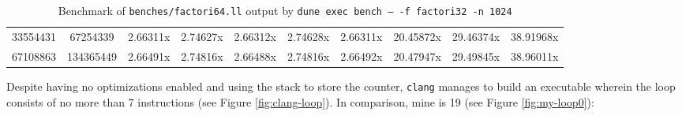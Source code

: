 \documentclass{article}
\begin{document}
\begin{table}[H]
{\begin{NiceTabular}{|c|ccccccccc|}
33554431 &  67254339&  2.66311x&  2.74627x&  2.66312x&  2.74628x&  2.66311x&  20.45872x&  29.46374x&  38.91968x\\
67108863 &  134365449&  2.66491x&  2.74816x&  2.66488x&  2.74816x&  2.66492x&  20.47947x&  29.49845x&  38.96011x\\
\hline
\end{NiceTabular}}
\caption{\label{tab:loopn0}Benchmark of \texttt{benches/factori64.ll} output by \texttt{dune exec bench -- -f factori32 -n 1024}}
\end{table}

\noindent Despite having no optimizations enabled and using the stack to store the counter, \texttt{clang} manages to build an executable wherein the loop consists of no more than 7 instructions (see Figure \ref{fig:clang-loop}). In comparison, mine is 19 (see Figure \ref{fig:my-loop0}):
\end{document}
